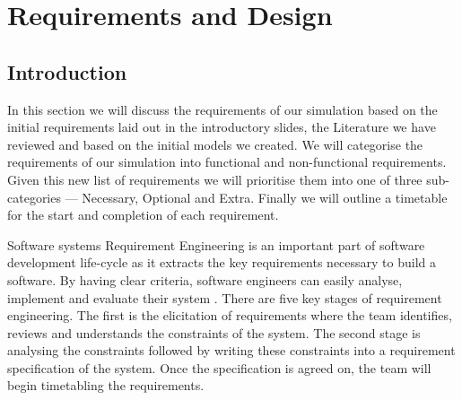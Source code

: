 \documentclass{article}
\begin{document}
%	

\section{Requirements and Design}\label{RequirementsAndDeisgn}

\subsection{Introduction}
	In this section we will discuss the requirements of our simulation based on the initial requirements laid out in the introductory slides, the Literature we have reviewed and based on the initial models we created. We will categorise the requirements of our simulation into functional and non-functional requirements. Given this new list of requirements we will prioritise them into one of three sub-categories  --- Necessary, Optional and Extra. Finally we will outline a timetable for the start and completion of each requirement.  
	
	 Software systems Requirement Engineering is an important part of software development life-cycle as it extracts the key requirements necessary to build a software. By having clear criteria, software engineers can easily analyse, implement and evaluate their system \cite{nuseibeh2000requirements}. There are five key stages of requirement engineering. The first is the elicitation of requirements where the team identifies, reviews and understands the constraints of the system. The second stage is analysing the constraints followed by writing these constraints into a requirement specification of the system. Once the specification is agreed on, the team will begin timetabling the requirements. 
	 
\end{document}
